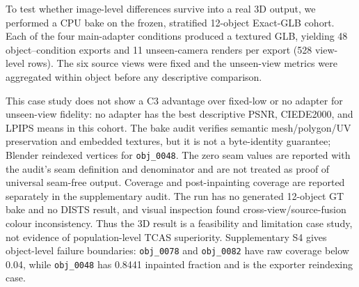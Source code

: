 \documentclass[times,twocolumn,final]{elsarticle}
\begin{document}
To test whether image-level differences survive into a real 3D output, we
performed a CPU bake on the frozen, stratified 12-object Exact-GLB cohort.
Each of the four main-adapter conditions produced a textured GLB, yielding 48
object--condition exports and 11 unseen-camera renders per export (528
view-level rows). The six source views were fixed and the unseen-view metrics
were aggregated within object before any descriptive comparison.

\begin{table}[t]
\centering
\caption{Descriptive unseen-view baking metrics for the 12-object stratified case study. These values are not a population estimate; DISTS was unavailable.}
\label{tab:bake12}
\small
{}
\end{table}

This case study does not show a C3 advantage over fixed-low or no adapter for
unseen-view fidelity: no adapter has the best descriptive PSNR, CIEDE2000, and
LPIPS means in this cohort. The bake audit verifies semantic mesh/polygon/UV
preservation and embedded textures, but it is not a byte-identity guarantee;
Blender reindexed vertices for \texttt{obj\_0048}. The zero seam values are
reported with the audit's seam definition and denominator and are not treated
as proof of universal seam-free output. Coverage and post-inpainting coverage
are reported separately in the supplementary audit. The run has no generated
12-object GT bake and no DISTS result, and visual inspection found
cross-view/source-fusion colour inconsistency. Thus the 3D result is a
feasibility and limitation case study, not evidence of population-level TCAS
superiority. Supplementary S4 gives object-level failure boundaries:
\texttt{obj\_0078} and \texttt{obj\_0082} have raw coverage below 0.04, while
\texttt{obj\_0048} has 0.8441 inpainted fraction and is the exporter
reindexing case.
\end{document}
